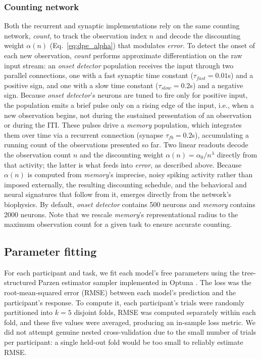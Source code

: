\documentclass[12pt]{article}
\begin{document}
\subsubsection*{Counting network}
Both the recurrent and synaptic implementations rely on the same counting network, \textit{count}, to track the observation index $n$ and decode the discounting weight $\alpha(n)$ (Eq.~\ref{eq:dpe_alpha}) that modulates \textit{error}. To detect the onset of each new observation, \textit{count} performs approximate differentiation on the raw input stream: an \textit{onset detector} population receives the input through two parallel connections, one with a fast synaptic time constant ($\tau_{fast}=0.01$s) and a positive sign, and one with a slow time constant ($\tau_{slow}=0.2$s) and a negative sign. Because \textit{onset detector}'s neurons are tuned to fire only for positive input, the population emits a brief pulse only on a rising edge of the input, i.e., when a new observation begins, not during the sustained presentation of an observation or during the ITI. These pulses drive a \textit{memory} population, which integrates them over time via a recurrent connection (synapse $\tau_{fb}=0.2$s), accumulating a running count of the observations presented so far. Two linear readouts decode the observation count $n$ and the discounting weight $\alpha(n)=\alpha_0/n^\lambda$ directly from that activity; the latter is what feeds into \textit{error}, as described above. Because $\alpha(n)$ is computed from \textit{memory}'s imprecise, noisy spiking activity rather than imposed externally, the resulting discounting schedule, and the behavioral and neural signatures that follow from it, emerges directly from the network's biophysics. By default, \textit{onset detector} contains 500 neurons and \textit{memory} contains 2000 neurons. Note that we rescale \textit{memory}'s representational radius to the maximum observation count for a given task to ensure accurate counting.

\subsection{Parameter fitting}
For each participant and task, we fit each model's free parameters using the tree-structured Parzen estimator sampler implemented in Optuna \cite{optuna_2019}. The loss was the root-mean-squared error (RMSE) between each model's prediction and the participant's response. To compute it, each participant's trials were randomly partitioned into $k=5$ disjoint folds, RMSE was computed separately within each fold, and these five values were averaged, producing an in-sample loss metric. We did not attempt genuine nested cross-validation due to the small number of trials per participant: a single held-out fold would be too small to reliably estimate RMSE.
\end{document}
